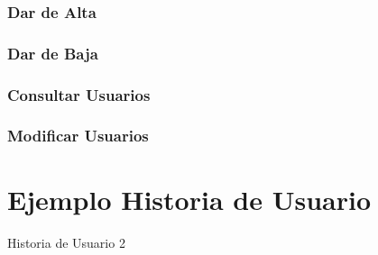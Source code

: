 \subsubsection{Dar de Alta}


\subsubsection{Dar de Baja}


\subsubsection{Consultar Usuarios}


\subsubsection{Modificar Usuarios}

\section{Ejemplo Historia de Usuario}

\begin{table}[hp]
	\centering
	{\small
		
	}
	\caption[Historia de Usuario 2]
	{Historia de Usuario 2}
	\label{tab:historia2}
\end{table}